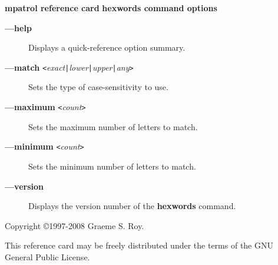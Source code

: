 \documentclass[a4paper,landscape,final]{article}
\newcommand{\heading}[1]{\textbf{\normalsize #1}}
\newcommand{\command}[1]{\textbf{#1}}
\newcommand{\flag}[1]{\textbf{---#1}}
\newcommand{\flagpar}[2]{\flag{#1} \texttt{<}\textit{#2}\texttt{>}}
\begin{document}
\begin{multicols}{3}{\textbf{\Large mpatrol reference card}}
\vskip 12pt
\heading{hexwords command options}
\vskip 6pt

\begin{description}
\item[\flag{help}]
Displays a quick-reference option summary.
\item[\flagpar{match}{exact\texttt{|}lower\texttt{|}upper\texttt{|}any}]
Sets the type of case-sensitivity to use.
\item[\flagpar{maximum}{count}]
Sets the maximum number of letters to match.
\item[\flagpar{minimum}{count}]
Sets the minimum number of letters to match.
\item[\flag{version}]
Displays the version number of the \command{hexwords} command.
\end{description}

\vskip 12pt
Copyright \copyright 1997-2008 Graeme S. Roy.
\vskip 6pt

This reference card may be freely distributed under the terms of the GNU General
Public License.

\end{multicols}
\end{document}
